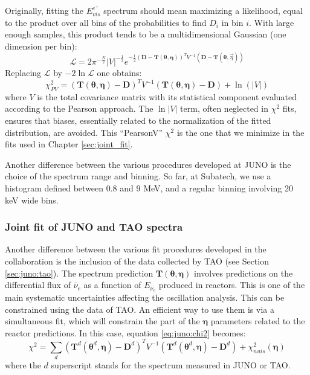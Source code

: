 \documentclass[../main.tex]{subfiles}
\begin{document}
Originally, fitting the $E^{e^+}_{vis}$ spectrum should mean maximizing a likelihood, equal to the product over all bins of the probabilities to find $D_i$ in bin $i$. With large enough samples, this product tends to be a multidimensional Gaussian (one dimension per bin):
\begin{equation}
  \mathcal{L} = 2\pi^{-\frac{N}{2}} |V|^{-\frac{1}{2}}  e^{-\frac{1}{2}\left(\bm{D}-\bm{T}(\bm{\theta},\bm{\eta})\right)^T V^{-1} \left( \bm{D}-\bm{T}(\bm{\theta},\vec{\eta}) \right)}
\end{equation}
Replacing $\mathcal{L}$ by $-2 \ln \mathcal{L}$ one obtains:
\begin{equation}
\chi^2_{PV} = \left(\bm{T}(\bm{\theta},\bm{\eta}) - \bm{D} \right)^T V^{-1} \left(\bm{T}(\bm{\theta},\bm{\eta}) - \bm{D}  \right) + \ln(|V|)
\end{equation}
where $V$ is the total covariance matrix with its statistical component evaluated according to the Pearson approach. The $\ln|V|$ term, often neglected in $\chi^2$ fits, ensures that biases, essentially related to the normalization of the fitted distribution, are avoided. This ``PearsonV'' $\chi^2$ is the one that we minimize in the fits used in Chapter \ref{sec:joint_fit}.

Another difference between the various procedures developed at JUNO is the choice of the spectrum range and binning. So far, at Subatech, we use a histogram defined between 0.8 and 9 MeV, and a regular binning involving 20 keV wide bins.

\subsubsection{Joint fit of JUNO and TAO spectra}

Another difference between the various fit procedures developed in the collaboration is the inclusion of the data collected by TAO (see Section \ref{sec:juno:tao}). The spectrum prediction $\bm{T}(\bm{\theta},\bm{\eta})$ involves predictions on the differential flux of $\bar{\nu}_e$ as a function of $E_{\bar{\nu}_e}$ produced in reactors. This is one of the main systematic uncertainties affecting the oscillation analysis. This can be constrained using the data of TAO. An efficient way to use them is via a simultaneous fit, which will constrain the part of the $\bm{\eta}$ parameters related to the reactor predictions. In this case, equation \ref{eq:juno:chi2} becomes:
\begin{equation}
  \chi^2 = \sum_{d}\left(\bm{T}^d(\bm{\theta}^d,\bm{\eta}) - \bm{D}^d  \right)^T V^{-1} \left(\bm{T}^d(\bm{\theta}^d,\bm{\eta}) - \bm{D}^d  \right) +  \chi^2_{nuis}(\bm{\eta})
\end{equation}
where the $d$ superscript stands for the spectrum measured in JUNO or TAO.
\end{document}
